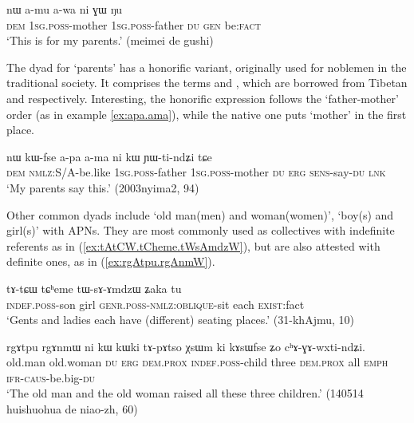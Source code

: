 \begin{exe}
\ex \label{ex:amu.awa.ni.GW}
 \gll nɯ a-mu a-wa ni ɣɯ ŋu \\
 \textsc{dem}  \textsc{1sg}.\textsc{poss}-mother \textsc{1sg}.\textsc{poss}-father \textsc{du} \textsc{gen} be:\textsc{fact} \\
 \glt `This is for my parents.' (meimei de gushi)
\end{exe}

The dyad for `parents' has a honorific variant, originally used for noblemen in the traditional society. It comprises the terms  and , which are borrowed from Tibetan   and  respectively. Interesting, the honorific expression follows the `father-mother' order (as in example \ref{ex:apa.ama}), while the native one puts `mother' in the first place.

\begin{exe}
\ex \label{ex:apa.ama}
 \gll nɯ kɯ-fse a-pa a-ma ni kɯ ɲɯ-ti-ndʑi tɕe \\
 \textsc{dem} \textsc{nmlz}:S/A-be.like \textsc{1sg}.\textsc{poss}-father  \textsc{1sg}.\textsc{poss}-mother \textsc{du} \textsc{erg} \textsc{sens}-say-\textsc{du} \textsc{lnk} \\
 \glt `My parents say this.' (2003nyima2, 94)
\end{exe}

Other common dyads include  `old man(men) and woman(women)',  `boy(s) and girl(s)' with APNs. They are most commonly used as collectives with indefinite referents as in (\ref{ex:tAtCW.tCheme.tWsAmdzW}), but are also attested with definite ones, as in (\ref{ex:rgAtpu.rgAnmW}).

\begin{exe}
\ex \label{ex:tAtCW.tCheme.tWsAmdzW}
 \gll  tɤ-tɕɯ tɕʰeme tɯ-sɤ-ɤmdzɯ ʑaka tu \\
 \textsc{indef}.\textsc{poss}-son girl \textsc{genr}.\textsc{poss}-\textsc{nmlz}:\textsc{oblique}-sit each \textsc{exist}:fact \\
\glt `Gents and ladies each have (different) seating places.' (31-khAjmu, 10)
\end{exe}

\begin{exe}
\ex \label{ex:rgAtpu.rgAnmW}
 \gll rgɤtpu rgɤnmɯ ni kɯ kɯki tɤ-pɤtso χsɯm ki kɤsɯfse ʑo cʰɤ-ɣɤ-wxti-ndʑi. \\
 old.man old.woman \textsc{du} \textsc{erg} \textsc{dem}.\textsc{prox} \textsc{indef}.\textsc{poss}-child three \textsc{dem.prox} all \textsc{emph} \textsc{ifr}-\textsc{caus}-be.big-\textsc{du} \\
\glt `The old man and the old woman raised all these three children.' (140514 huishuohua de niao-zh, 60)
\end{exe}

